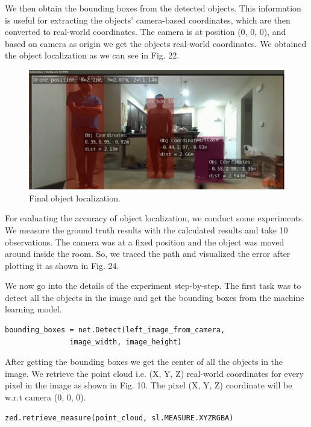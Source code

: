 \documentclass{IEEEtran}
\begin{document}
We then obtain the bounding boxes from the detected objects. This information is useful for extracting the objects’ camera-based coordinates, which are then converted to real-world coordinates. The camera is at position (0, 0, 0), and based on camera as origin we get the objects real-world coordinates. We obtained the object localization as we can see in Fig. 22.

\begin{figure}[htb]
\centering
\includegraphics[width=1\linewidth]{fig/final_detect_jay.jpg}
\caption{Final object localization.} \label{fig.structure}
\end{figure}

For evaluating the accuracy of object localization, we conduct some experiments. We measure the ground truth results with the calculated results and take 10 observations. The camera was at a fixed position and the object was moved around inside the room. So, we traced the path and visualized the error after plotting it as shown in Fig. 24.

We now go into the details of the experiment step-by-step. The first task was to detect all the objects in the image and get the bounding boxes from the machine learning model.

\lstset{language=Python}
\lstset{basicstyle=\footnotesize}

\begin{lstlisting}
bounding_boxes = net.Detect(left_image_from_camera, 
			   image_width, image_height)
\end{lstlisting}

After getting the bounding boxes we get the center of all the objects in the image. We retrieve the point cloud i.e. (X, Y, Z) real-world coordinates for every pixel in the image as shown in Fig. 10. The pixel (X, Y, Z) coordinate will be w.r.t camera (0, 0, 0).

\begin{lstlisting}
zed.retrieve_measure(point_cloud, sl.MEASURE.XYZRGBA)
\end{lstlisting}
\end{document}

